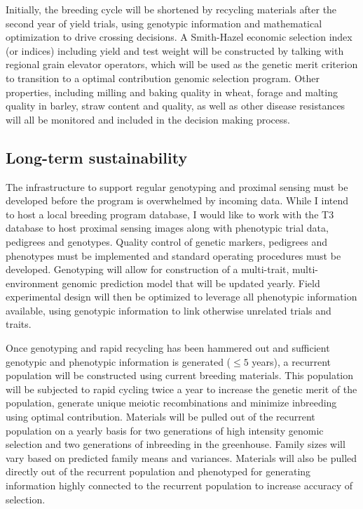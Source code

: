 \documentclass[11pt]{article}
\begin{document}
Initially, the breeding cycle will be shortened by recycling materials after the second year of yield trials, using genotypic information and mathematical optimization to drive crossing decisions. A Smith-Hazel economic selection index (or indices) including yield and test weight will be constructed by talking with regional grain elevator operators, which will be used as the genetic merit criterion to transition to a optimal contribution genomic selection program. Other properties, including milling and baking quality in wheat, forage and malting quality in barley, straw content and quality, as well as other disease resistances will all be monitored and included in the decision making process. 

\subsection*{Long-term sustainability}

The infrastructure to support regular genotyping and proximal sensing must be developed before the program is overwhelmed by incoming data. While I intend to host a local breeding program database, I would like to work with the T3 database to host proximal sensing images along with phenotypic trial data, pedigrees and genotypes. Quality control of genetic markers, pedigrees and phenotypes must be implemented and standard operating procedures must be developed. Genotyping will allow for construction of a multi-trait, multi-environment genomic prediction model that will be updated yearly. Field experimental design will then be optimized to leverage all phenotypic information available, using genotypic information to link otherwise unrelated trials and traits.


Once genotyping and rapid recycling has been hammered out and sufficient genotypic and phenotypic information is generated ($\leq 5$ years), a recurrent population will be constructed using current breeding materials. This population will be subjected to rapid cycling twice a year to increase the genetic merit of the population, generate unique meiotic recombinations and minimize inbreeding using optimal contribution. Materials will be pulled out of the recurrent population on a yearly basis for two generations of high intensity genomic selection and two generations of inbreeding in the greenhouse. Family sizes will vary based on predicted family means and variances. Materials will also be pulled directly out of the recurrent population and phenotyped for generating information highly connected to the recurrent population to increase accuracy of selection. 
\end{document}
